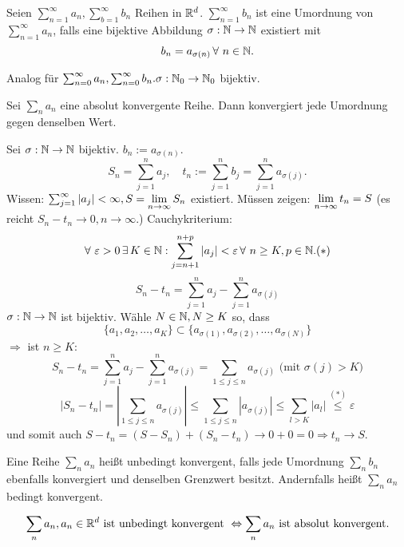 \documentclass[../ana1.tex]{subfiles}
\begin{document}
\begin{defi}[Umordnung]
    Seien \( \sum_{n=1}^\infty a_n, \sum_{b=1}^\infty b_n \) Reihen in \( \mathbb{R}^d \). \( \sum_{n=1}^\infty b_n \) ist eine Umordnung von \( \sum_{n=1}^\infty a_n \), falls eine bijektive Abbildung \( \sigma:\mathbb{N}\rightarrow\mathbb{N} \) existiert mit
    \[ b_n = a_{\sigma(n)} \,\forall \, n\in\N. \]
\end{defi}
\begin{bem}
    Analog für \( \sum_{n=0}^\infty a_n, \sum_{n=0}^\infty b_n. \sigma: \mathbb{N}_0 \rightarrow \mathbb{N}_0 \) bijektiv.
\end{bem}
\begin{satz}[Umordnungssatz]
    Sei \( \sum_n a_n \) eine absolut konvergente Reihe. Dann konvergiert jede Umordnung gegen denselben Wert.
\end{satz}
\begin{bew}
    Sei \( \sigma : \mathbb{N}\rightarrow\mathbb{N} \) bijektiv. \( b_n := a_{\sigma(n)} \).
    \[ S_n = \sum_{j=1}^n a_j, \quad t_n := \sum_{j=1}^n b_j = \sum_{j=1}^n a_{\sigma(j)}. \]
    Wissen: \( \sum_{j=1}^\infty |a_j| < \infty, S = \lim\limits_{n\rightarrow\infty} S_n \) existiert.
    Müssen zeigen: \( \lim\limits_{n\rightarrow\infty} t_n = S \) (es reicht \( S_n - t_n \rightarrow 0, n\rightarrow\infty \).)
    Cauchykriterium: 
    \[ \forall \, \varepsilon > 0 \, \exists K\in\N: \sum_{j=n+1}^{n+p} |a_j| < \varepsilon \,\forall \, n\geq K, p\in\N. (*) \]
    \[ S_n - t_n = \sum_{j=1}^n a_j - \sum_{j=1}^n a_{\sigma(j)} \]
    \( \sigma : \mathbb{N}\rightarrow\mathbb{N} \) ist bijektiv. Wähle \( N\in\mathbb{N}, N\geq K \) so, dass
    \[ \{ a_1, a_2, \ldots, a_K \} \subset \{ a_{\sigma(1)}, a_{\sigma(2)}, \ldots, a_{\sigma(N)} \} \]
    \( \Rightarrow \) ist \( n\geq K \):
    \[ S_n - t_n = \sum_{j=1}^n a_j - \sum_{j=1}^n a_{\sigma(j)} = \sum_{1\leq j \leq n} a_{\sigma(j)} \text{ (mit } \sigma(j) > K\text{)} \]
    \[ |S_n - t_n| = \left| \sum_{1\leq j \leq n} a_{\sigma(j)} \right| \leq \sum_{1\leq j \leq n} | a_{\sigma(j)} | \leq \sum_{l>K} |a_l| \overset{(*)}{\leq}\varepsilon \]
    und somit auch \( S - t_n = (S-S_n) + (S_n - t_n) \rightarrow 0 + 0 = 0 \Rightarrow t_n \rightarrow S \).
\end{bew}
\begin{bem}
    Eine Reihe \( \sum_n a_n \) heißt unbedingt konvergent, falls jede Umordnung \( \sum_n b_n \) ebenfalls konvergiert und denselben Grenzwert besitzt. Andernfalls heißt \( \sum_n a_n \) bedingt konvergent.
\end{bem}
\begin{satz*}[Dirichlet 1837]
    \[ \sum_n a_n, a_n \in\mathbb{R}^d \text{ ist unbedingt konvergent } \Leftrightarrow \sum_n a_n \text{ ist absolut konvergent.} \]
\end{satz*}
\end{document}
